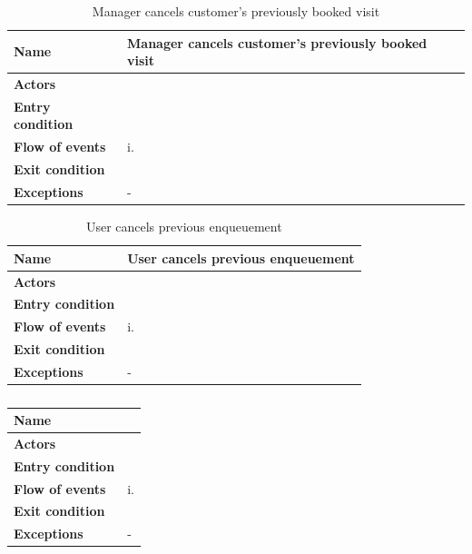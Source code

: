 \begin{table}[h!]
    \centering
    \begin{tabular}{@{}P{0.2\textwidth}P{0.70\textwidth}@{}}
        \toprule
        \textbf{Name}                 & Manager cancels customer’s previously booked visit\\
        \midrule
        \textbf{Actors}               & \\
        \textbf{Entry condition}      & \\
        \textbf{Flow of events}            
        & i.\\
        \textbf{Exit condition}       & \\
        \textbf{Exceptions}           
        & - \\
        \bottomrule
    \end{tabular}
\caption{Manager cancels customer’s previously booked visit}
\label{table:managercancelscustomerspreviouslybookedvisit}
\end{table}

\begin{table}[h!]
    \centering
    \begin{tabular}{@{}P{0.2\textwidth}P{0.70\textwidth}@{}}
        \toprule
        \textbf{Name}                 & User cancels previous enqueuement\\
        \midrule
        \textbf{Actors}               & \\
        \textbf{Entry condition}      & \\
        \textbf{Flow of events}            
        & i.\\
        \textbf{Exit condition}       & \\
        \textbf{Exceptions}           
        & - \\
        \bottomrule
    \end{tabular}
\caption{User cancels previous enqueuement}
\label{table:usercnacelspreviousenquement}
\end{table}

\begin{table}[h!]
    \centering
    \begin{tabular}{@{}P{0.2\textwidth}P{0.70\textwidth}@{}}
        \toprule
        \textbf{Name}                 & \\
        \midrule
        \textbf{Actors}               & \\
        \textbf{Entry condition}      & \\
        \textbf{Flow of events}            
        & i.\\
        \textbf{Exit condition}       & \\
        \textbf{Exceptions}           
        & - \\
        \bottomrule
    \end{tabular}
\caption{}
\label{table:}
\end{table}

